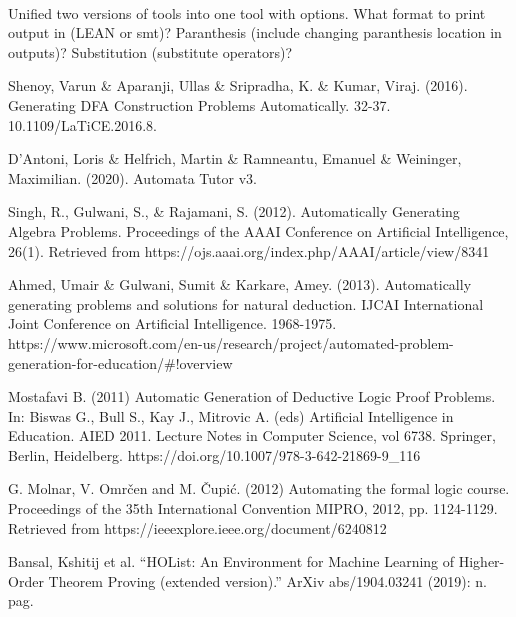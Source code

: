 \documentclass{report}
\begin{document}
\paragraph{}
Unified two versions of tools into one tool with options. What format to print output in (LEAN or smt)? Paranthesis (include changing paranthesis location in outputs)? Substitution (substitute operators)?



\begin{thebibliography}{20}
 Shenoy, Varun \& Aparanji, Ullas \& Sripradha, K. \& Kumar, Viraj. (2016). Generating DFA Construction Problems Automatically. 32-37. 10.1109/LaTiCE.2016.8. 


 D'Antoni, Loris \& Helfrich, Martin \& Ramneantu, Emanuel \& Weininger, Maximilian. (2020). Automata Tutor v3. 


 Singh, R., Gulwani, S., \& Rajamani, S. (2012). Automatically Generating Algebra Problems. Proceedings of the AAAI Conference on Artificial Intelligence, 26(1). Retrieved from https://ojs.aaai.org/index.php/AAAI/article/view/8341 


 Ahmed, Umair \& Gulwani, Sumit \& Karkare, Amey. (2013). Automatically generating problems and solutions for natural deduction. IJCAI International Joint Conference on Artificial Intelligence. 1968-1975. https://www.microsoft.com/en-us/research/project/automated-problem-generation-for-education/\#!overview


 Mostafavi B. (2011) Automatic Generation of Deductive Logic Proof Problems. In: Biswas G., Bull S., Kay J., Mitrovic A. (eds) Artificial Intelligence in Education. AIED 2011. Lecture Notes in Computer Science, vol 6738. Springer, Berlin, Heidelberg. https://doi.org/10.1007/978-3-642-21869-9\_116

 G. Molnar, V. Omrčen and M. Čupić. (2012) Automating the formal logic course. Proceedings of the 35th International Convention MIPRO, 2012, pp. 1124-1129. Retrieved from https://ieeexplore.ieee.org/document/6240812

 Bansal, Kshitij et al. “HOList: An Environment for Machine Learning of Higher-Order Theorem Proving (extended version).” ArXiv abs/1904.03241 (2019): n. pag.

\end{thebibliography}
\end{document}
